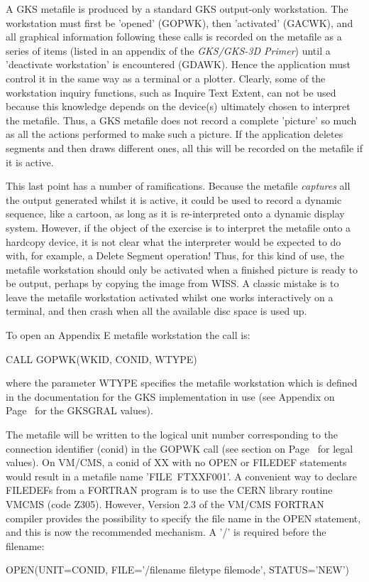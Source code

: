 A GKS metafile is produced by a standard GKS output-only workstation.
The workstation must first be 'opened' (GOPWK), then 'activated' (GACWK),
and all graphical information following these calls is recorded on the
metafile as a series of items (listed in an appendix of the
{\it GKS/GKS-3D Primer})
until a 'deactivate workstation' is encountered (GDAWK).
Hence the application must control it in the same way as a terminal
or a plotter. Clearly, some of the workstation inquiry functions,
such as Inquire Text Extent, can not be used because this knowledge
depends on the device(s) ultimately chosen to interpret the metafile.
Thus, a GKS metafile does not record a complete 'picture' so much
as all the actions performed to make such a picture. If the application
deletes segments and then draws different ones, all this will be recorded
on the metafile if it is active.
 
This last point has a number of ramifications. Because the metafile
{\it captures} all the output generated whilst it is active,
it could be used to record a dynamic sequence, like a cartoon,
as long as it is re-interpreted onto a dynamic display system.
However, if the object of the exercise is to interpret the metafile onto
a hardcopy device, it is not clear what the interpreter would be expected
to do with, for example, a Delete Segment operation!
Thus, for this kind of use, the metafile workstation should only be
activated when a finished picture is ready to be output, perhaps by
copying the image from WISS. A classic mistake is to leave the metafile
workstation activated whilst one works interactively on a terminal,
and then crash when all the available disc space is used up.
 
To open an Appendix E metafile workstation the call is:
\begin{XMP}
CALL GOPWK(WKID, CONID, WTYPE)
\end{XMP}
where the parameter WTYPE specifies the metafile workstation which is
defined in the documentation for the GKS implementation in use
(see Appendix on Page~\pageref{sec:gtstyp} for the GKSGRAL values).
 
The metafile will be written to the logical unit number corresponding
to the connection identifier (conid) in the GOPWK call
(see section on Page~\pageref{sec:conref} for legal values).
On VM/CMS, a conid of XX with no OPEN or FILEDEF statements would result
in a metafile name 'FILE~FTXXF001'.
A convenient way to declare FILEDEFs from a FORTRAN program is to use
the CERN library routine VMCMS (code Z305).
However, Version 2.3 of the VM/CMS FORTRAN compiler provides the
possibility to specify the file name in the OPEN statement,
and this is now the recommended mechanism. A '/' is required
before the filename:
\begin{XMP}
OPEN(UNIT=CONID, FILE='/filename filetype filemode', STATUS='NEW')
\end{XMP}
 
